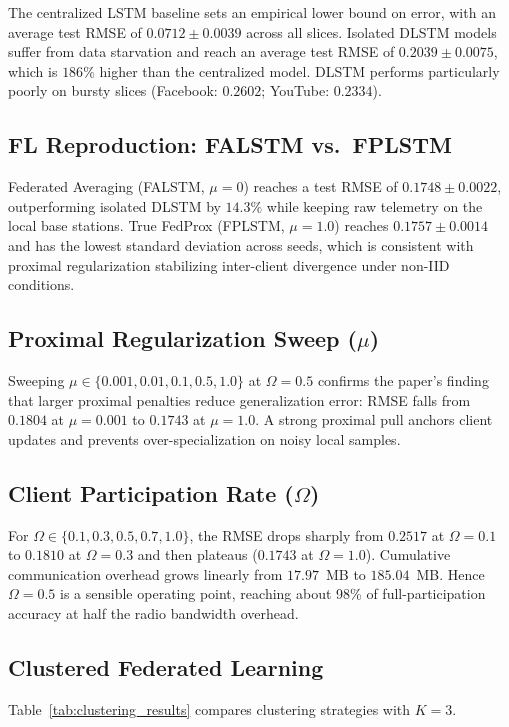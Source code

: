 \documentclass[11pt,a4paper]{article}
\begin{document}
The centralized LSTM baseline sets an empirical lower bound on error, with an average test RMSE of $0.0712 \pm 0.0039$ across all slices. Isolated DLSTM models suffer from data starvation and reach an average test RMSE of $0.2039 \pm 0.0075$, which is $186\%$ higher than the centralized model. DLSTM performs particularly poorly on bursty slices (Facebook: $0.2602$; YouTube: $0.2334$).

\subsection{FL Reproduction: FALSTM vs.\ FPLSTM}
Federated Averaging (FALSTM, $\mu=0$) reaches a test RMSE of $0.1748 \pm 0.0022$, outperforming isolated DLSTM by $14.3\%$ while keeping raw telemetry on the local base stations. True FedProx (FPLSTM, $\mu=1.0$) reaches $0.1757 \pm 0.0014$ and has the lowest standard deviation across seeds, which is consistent with proximal regularization stabilizing inter-client divergence under non-IID conditions.

\subsection{Proximal Regularization Sweep ($\mu$)}
Sweeping $\mu \in \{0.001, 0.01, 0.1, 0.5, 1.0\}$ at $\Omega = 0.5$ confirms the paper's finding that larger proximal penalties reduce generalization error: RMSE falls from $0.1804$ at $\mu=0.001$ to $0.1743$ at $\mu=1.0$. A strong proximal pull anchors client updates and prevents over-specialization on noisy local samples.

\subsection{Client Participation Rate ($\Omega$)}
For $\Omega \in \{0.1, 0.3, 0.5, 0.7, 1.0\}$, the RMSE drops sharply from $0.2517$ at $\Omega=0.1$ to $0.1810$ at $\Omega=0.3$ and then plateaus ($0.1743$ at $\Omega=1.0$). Cumulative communication overhead grows linearly from $17.97$~MB to $185.04$~MB. Hence $\Omega = 0.5$ is a sensible operating point, reaching about 98\% of full-participation accuracy at half the radio bandwidth overhead.

\subsection{Clustered Federated Learning}
Table~\ref{tab:clustering_results} compares clustering strategies with $K=3$.
\end{document}
